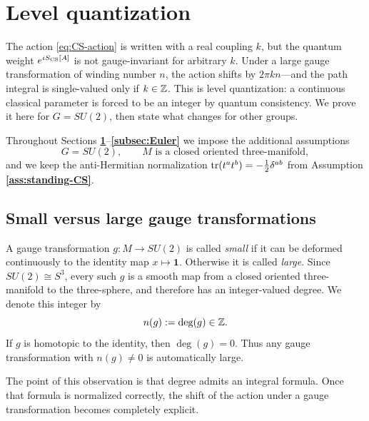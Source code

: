 \section{Level quantization}\label{sec:level-quantization}

The action \eqref{eq:CS-action} is written with a real coupling $k$, but the quantum weight $e^{iS_{\operatorname{CS}}[A]}$ is not gauge-invariant for arbitrary $k$.  Under a large gauge transformation of winding number $n$, the action shifts by $2\pi k n$---and the path integral is single-valued only if $k \in \mathbb{Z}$.  This is level quantization: a continuous classical parameter is forced to be an integer by quantum consistency.  We prove it here for $G = SU(2)$, then state what changes for other groups.

\begin{assumption}\label{ass:level-quantization}
Throughout Sections \textbf{\ref{sec:level-quantization}}--\textbf{\ref{subsec:Euler}} we impose the additional assumptions
\begin{equation*}
G = SU(2),
\qquad
M \text{ is a closed oriented three-manifold},
\end{equation*}
and we keep the anti-Hermitian normalization $\operatorname{tr}(t^at^b) = -\tfrac{1}{2}\delta^{ab}$ from Assumption \textbf{\ref{ass:standing-CS}}.
\end{assumption}

\subsection{Small versus large gauge transformations}

A gauge transformation $g:M\to SU(2)$ is called \emph{small} if it can be deformed continuously to the identity map $x\mapsto \mathbf{1}$. Otherwise it is called \emph{large}. Since $SU(2)\cong S^3$, every such $g$ is a smooth map from a closed oriented three-manifold to the three-sphere, and therefore has an integer-valued degree. We denote this integer by
\begin{equation*}
n(g) := \deg(g)\in \mathbb{Z}.
\end{equation*}
If $g$ is homotopic to the identity, then $\deg(g)=0$. Thus any gauge transformation with $n(g)\neq 0$ is automatically large.

\medskip

\noindent The point of this observation is that degree admits an integral formula. Once that formula is normalized correctly, the shift of the action under a gauge transformation becomes completely explicit.

